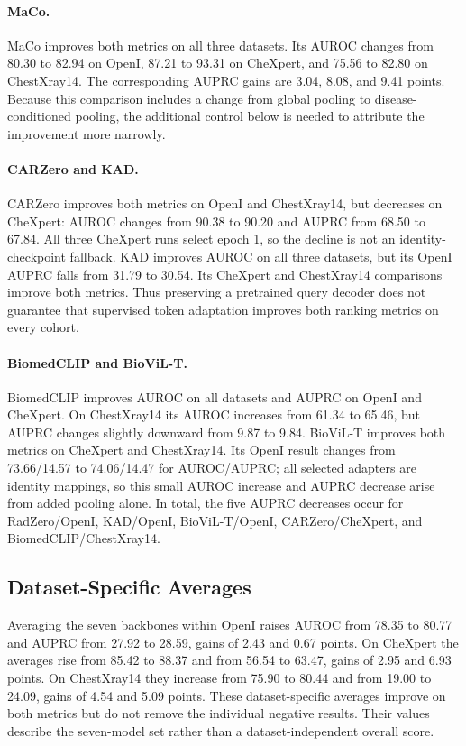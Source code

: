 \documentclass[10pt,twocolumn,letterpaper]{article}
\begin{document}
\paragraph{MaCo.}
MaCo improves both metrics on all three datasets. Its AUROC changes from 80.30 to 82.94 on OpenI, 87.21 to 93.31 on CheXpert, and 75.56 to 82.80 on ChestXray14. The corresponding AUPRC gains are 3.04, 8.08, and 9.41 points. Because this comparison includes a change from global pooling to disease-conditioned pooling, the additional control below is needed to attribute the improvement more narrowly.

\paragraph{CARZero and KAD.}
CARZero improves both metrics on OpenI and ChestXray14, but decreases on CheXpert: AUROC changes from 90.38 to 90.20 and AUPRC from 68.50 to 67.84. All three CheXpert runs select epoch 1, so the decline is not an identity-checkpoint fallback. KAD improves AUROC on all three datasets, but its OpenI AUPRC falls from 31.79 to 30.54. Its CheXpert and ChestXray14 comparisons improve both metrics. Thus preserving a pretrained query decoder does not guarantee that supervised token adaptation improves both ranking metrics on every cohort.

\paragraph{BiomedCLIP and BioViL-T.}
BiomedCLIP improves AUROC on all datasets and AUPRC on OpenI and CheXpert. On ChestXray14 its AUROC increases from 61.34 to 65.46, but AUPRC changes slightly downward from 9.87 to 9.84. BioViL-T improves both metrics on CheXpert and ChestXray14. Its OpenI result changes from 73.66/14.57 to 74.06/14.47 for AUROC/AUPRC; all selected adapters are identity mappings, so this small AUROC increase and AUPRC decrease arise from added pooling alone. In total, the five AUPRC decreases occur for RadZero/OpenI, KAD/OpenI, BioViL-T/OpenI, CARZero/CheXpert, and BiomedCLIP/ChestXray14.

\subsection{Dataset-Specific Averages}
Averaging the seven backbones within OpenI raises AUROC from 78.35 to 80.77 and AUPRC from 27.92 to 28.59, gains of 2.43 and 0.67 points. On CheXpert the averages rise from 85.42 to 88.37 and from 56.54 to 63.47, gains of 2.95 and 6.93 points. On ChestXray14 they increase from 75.90 to 80.44 and from 19.00 to 24.09, gains of 4.54 and 5.09 points. These dataset-specific averages improve on both metrics but do not remove the individual negative results. Their values describe the seven-model set rather than a dataset-independent overall score.
\end{document}
